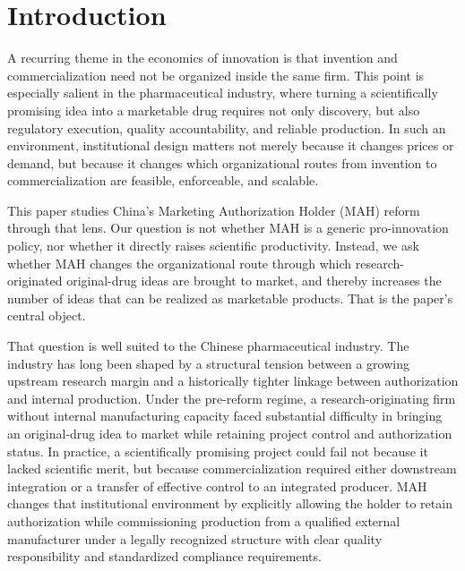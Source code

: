 %

\section{Introduction}

A recurring theme in the economics of innovation is that invention and commercialization need not be organized inside the same firm. This point is especially salient in the pharmaceutical industry, where turning a scientifically promising idea into a marketable drug requires not only discovery, but also regulatory execution, quality accountability, and reliable production. In such an environment, institutional design matters not merely because it changes prices or demand, but because it changes which organizational routes from invention to commercialization are feasible, enforceable, and scalable.

This paper studies China's Marketing Authorization Holder (MAH) reform through that lens. Our question is not whether MAH is a generic pro-innovation policy, nor whether it directly raises scientific productivity. Instead, we ask whether MAH changes the organizational route through which research-originated original-drug ideas are brought to market, and thereby increases the number of ideas that can be realized as marketable products. That is the paper's central object.

That question is well suited to the Chinese pharmaceutical industry. The industry has long been shaped by a structural tension between a growing upstream research margin and a historically tighter linkage between authorization and internal production. Under the pre-reform regime, a research-originating firm without internal manufacturing capacity faced substantial difficulty in bringing an original-drug idea to market while retaining project control and authorization status. In practice, a scientifically promising project could fail not because it lacked scientific merit, but because commercialization required either downstream integration or a transfer of effective control to an integrated producer. MAH changes that institutional environment by explicitly allowing the holder to retain authorization while commissioning production from a qualified external manufacturer under a legally recognized structure with clear quality responsibility and standardized compliance requirements.

